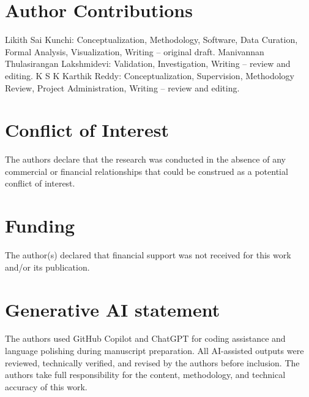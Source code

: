 \documentclass[utf8]{FrontiersinHarvard}
\begin{document}
\section*{Author Contributions}
Likith Sai Kunchi: Conceptualization, Methodology, Software, Data Curation, Formal Analysis, Visualization, Writing -- original draft. Manivannan Thulasirangan Lakshmidevi: Validation, Investigation, Writing -- review and editing. K S K Karthik Reddy: Conceptualization, Supervision, Methodology Review, Project Administration, Writing -- review and editing.

\section*{Conflict of Interest}
The authors declare that the research was conducted in the absence of any commercial or financial relationships that could be construed as a potential conflict of interest.

\section*{Funding}
The author(s) declared that financial support was not received
for this work and/or its publication.

\section*{Generative AI statement}
The authors used GitHub Copilot and ChatGPT for coding assistance and language polishing during manuscript preparation. All AI-assisted outputs were reviewed, technically verified, and revised by the authors before inclusion. The authors take full responsibility for the content, methodology, and technical accuracy of this work.



\end{document}
